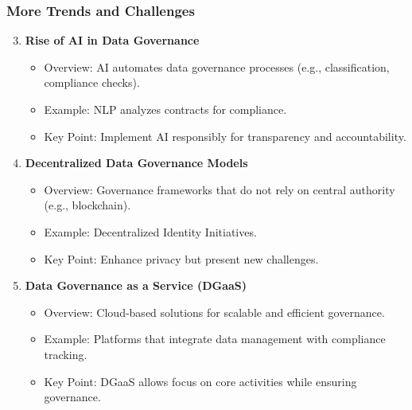 \documentclass[aspectratio=169]{beamer}
\begin{document}
\begin{frame}[fragile]
    \frametitle{More Trends and Challenges}
    \begin{enumerate}
        \setcounter{enumi}{2}
        \item \textbf{Rise of AI in Data Governance}
        \begin{itemize}
            \item Overview: AI automates data governance processes (e.g., classification, compliance checks).
            \item Example: NLP analyzes contracts for compliance.
            \item Key Point: Implement AI responsibly for transparency and accountability.
        \end{itemize}

        \item \textbf{Decentralized Data Governance Models}
        \begin{itemize}
            \item Overview: Governance frameworks that do not rely on central authority (e.g., blockchain).
            \item Example: Decentralized Identity Initiatives.
            \item Key Point: Enhance privacy but present new challenges.
        \end{itemize}

        \item \textbf{Data Governance as a Service (DGaaS)}
        \begin{itemize}
            \item Overview: Cloud-based solutions for scalable and efficient governance.
            \item Example: Platforms that integrate data management with compliance tracking.
            \item Key Point: DGaaS allows focus on core activities while ensuring governance.
        \end{itemize}
    \end{enumerate}
\end{frame}
\end{document}
